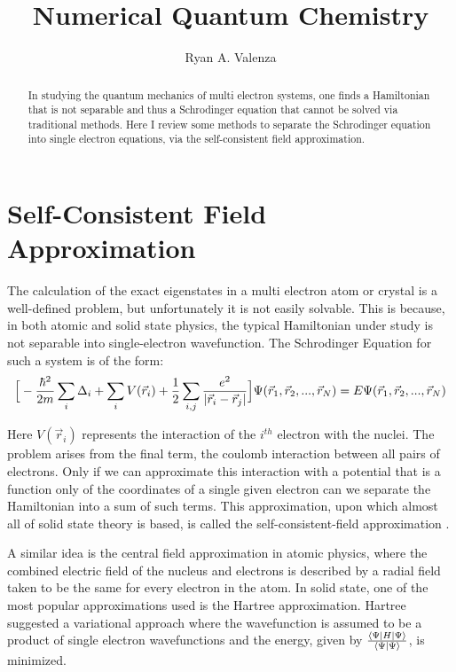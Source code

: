 \documentclass[notitlepage,letter,preprint,prb]{revtex4}
\begin{document}
	\title{Numerical Quantum Chemistry}
	\author{Ryan A. Valenza}
\nopagebreak
\begin{abstract}
	In studying the quantum mechanics of multi electron systems, one finds a Hamiltonian that is not separable and thus a Schrodinger equation that cannot be solved via traditional methods.  Here I review some methods to separate the Schrodinger equation into single electron equations, via the self-consistent field approximation.
\end{abstract}
\maketitle 

\section{Self-Consistent Field Approximation}
	The calculation of the exact eigenstates in a multi electron atom or crystal is a well-defined problem, but unfortunately it is not easily solvable.  This is because, in both atomic and solid state physics, the typical Hamiltonian under study is not separable into single-electron wavefunction.  The Schrodinger Equation for such a system is of the form:
	\begin{equation}
	\Big{[}-\frac{\hbar^2}{2m}\sum_{i}\Delta_{i} + \sum_{i}V(\vec{r}_i) + \frac{1}{2}\sum_{i,j}\frac{e^2}{|\vec{r}_i-\vec{r}_j|}\Big{]}\Psi(\vec{r}_1,\vec{r}_2,...,\vec{r}_N) = E\Psi(\vec{r}_1,\vec{r}_2,...,\vec{r}_N) 
	\nonumber
	\end{equation}
	
	Here $V(\vec{r}_i)$ represents the interaction of the $i^{th}$ electron with the nuclei.  The problem arises from the final term, the coulomb interaction between all pairs of electrons.  Only if we can approximate this interaction with a potential that is a function only of the coordinates of a single given electron can we separate the Hamiltonian into a sum of such terms.  This approximation, upon which almost all of solid state theory is based, is called the self-consistent-field approximation \citealp{solidstate}.

	A similar idea is the central field approximation in atomic physics, where the combined electric field of the nucleus and electrons is described by a radial field taken to be the same for every electron in the atom.  In solid state, one of the most popular approximations used is the Hartree approximation.  Hartree suggested a variational approach where the wavefunction is assumed to be a product of single electron wavefunctions and the energy, given by $\frac{\bra{\Psi}H\ket{\Psi}}{\braket{\Psi|\Psi}}$, is minimized.  
	\pagebreak
	
\end{document}
